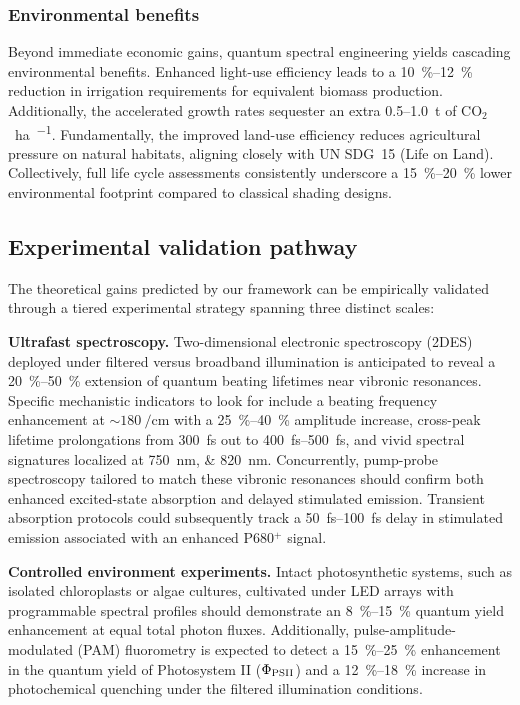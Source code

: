 \subsubsection{Environmental benefits}

Beyond immediate economic gains, quantum spectral engineering yields cascading environmental benefits. Enhanced light-use efficiency leads to a \SIrange{10}{12}{\percent} reduction in irrigation requirements for equivalent biomass production. Additionally, the accelerated growth rates sequester an extra \numrange{0.5}{1.0}~\si{\tonne} of $\text{CO}_2$ \si{\per\hectare\per\yr}. Fundamentally, the improved land-use efficiency reduces agricultural pressure on natural habitats, aligning closely with UN SDG~15 (Life on Land). Collectively, full life cycle assessments consistently underscore a \SIrange{15}{20}{\percent} lower environmental footprint compared to classical shading designs.

\subsection{Experimental validation pathway}

The theoretical gains predicted by our framework can be empirically validated through a tiered experimental strategy spanning three distinct scales:

\textbf{Ultrafast spectroscopy.} Two-dimensional electronic spectroscopy (2DES) deployed under filtered versus broadband illumination is anticipated to reveal a \SIrange{20}{50}{\percent} extension of quantum beating lifetimes near vibronic resonances. Specific mechanistic indicators to look for include a beating frequency enhancement at $\sim \SI{180}{\per\cm}$ with a \SIrange{25}{40}{\percent} amplitude increase, cross-peak lifetime prolongations from \SI{300}{\femto\second} out to \SIrange{400}{500}{\femto\second}, and vivid spectral signatures localized at \SIlist{750;820}{\nano\meter}. Concurrently, pump-probe spectroscopy tailored to match these vibronic resonances should confirm both enhanced excited-state absorption and delayed stimulated emission. Transient absorption protocols could subsequently track a \SIrange{50}{100}{\femto\second} delay in stimulated emission associated with an enhanced P680$^+$ signal.

\textbf{Controlled environment experiments.} Intact photosynthetic systems, such as isolated chloroplasts or algae cultures, cultivated under LED arrays with programmable spectral profiles should demonstrate an \SIrange{8}{15}{\percent} quantum yield enhancement at equal total photon fluxes. Additionally, pulse-amplitude-modulated (PAM) fluorometry is expected to detect a \SIrange{15}{25}{\percent} enhancement in the quantum yield of Photosystem II ($\Phi_{\rm PSII}$) and a \SIrange{12}{18}{\percent} increase in photochemical quenching under the filtered illumination conditions.

